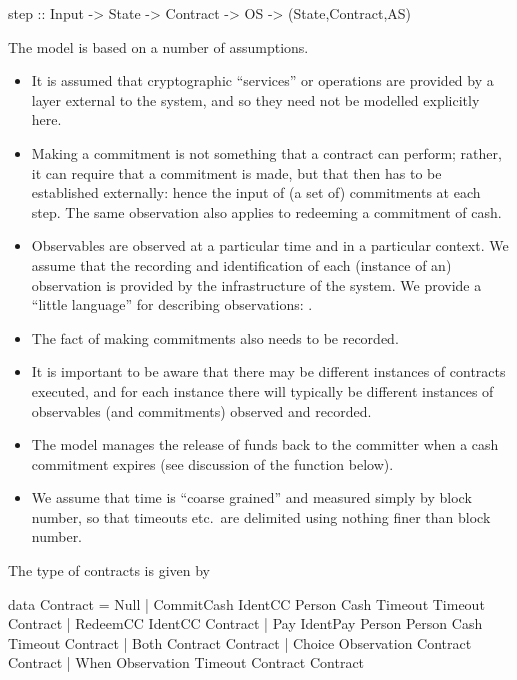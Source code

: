 \documentclass[
      acmsmall
    , screen
    , review=true
  ]{acmart}
\begin{document}
\begin{haskellcode}
step :: Input -> State -> Contract -> OS -> (State,Contract,AS)
\end{haskellcode}

The model is based on a number of assumptions.

\begin{itemize}
\item It is assumed that cryptographic ``services'' or operations are provided by a layer external to the system, and so they need not be modelled explicitly here.
\item Making a commitment is not something that a contract can perform; rather, it can require that a commitment is made, but that then has to be established externally: hence the input of (a set of) commitments at each step. The same observation also applies to redeeming a commitment of cash.
\item Observables are observed at a particular time and in a particular context. We assume that the recording and identification of each (instance of an) observation is provided by the infrastructure of the system. We provide a ``little language'' for describing observations: .
\item The fact of making commitments also needs to be recorded.
\item It is important to be aware that there may be different instances of contracts executed, and for each instance there will typically be different instances of observables (and commitments) observed and recorded.
\item The model manages the release of funds back to the committer when a cash commitment expires (see discussion of the  function below).
\item We assume that time is ``coarse grained'' and measured simply by block number, so that timeouts etc.\ are delimited using nothing finer than block number. 
\end{itemize}

\medskip
\noindent
The type of contracts is given by

\begin{haskellcode}
data Contract =
   Null |
   CommitCash IdentCC Person Cash Timeout Timeout Contract |  
   RedeemCC IdentCC Contract |
   Pay IdentPay Person Person Cash Timeout Contract |  
   Both Contract Contract |
   Choice Observation Contract Contract |
   When Observation Timeout Contract Contract   
   \end{haskellcode}
\end{document}
